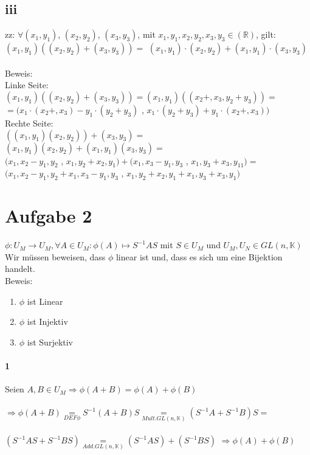 \documentclass[10pt,a4paper]{article}
\begin{document}
\subsection{iii}
zz: $\forall (x_{1},y_{1})$, $(x_{2},y_{2})$, $(x_{3},y_{3})$, mit $x_{1},y_{1},x_{2},y_{2},x_{3},y_{3} \in (\mathbb{R}) $,  gilt:\\
$(x_{1},y_{1})((x_{2},y_{2}) + (x_{3},y_{3})) = $ 
$(x_{1},y_{1}) \cdot (x_{2},y_{2}) + (x_{1},y_{1}) \cdot (x_{3},y_{3})$\\\\
Beweis:\\
Linke Seite:\\
$(x_{1},y_{1})((x_{2},y_{2}) + (x_{3},y_{3})) = (x_{1},y_{1})((x_{2}+,x_{3},y_{2}+y_{3})) =$\\
$= (x_{1}\cdot (x_{2}+,x_{3})-y_{1}\cdot (y_{2}+y_{3})$ , $x_{1}\cdot (y_{2}+y_{3})+y_{1}\cdot (x_{2}+,x_{3})) $ \\
Rechte Seite:\\
$((x_{1},y_{1})(x_{2},y_{2})) + (x_{3},y_{3}) = $ \\
$(x_{1},y_{1})(x_{2},y_{2})+(x_{1},y_{1})(x_{3},y_{3}) =$ \\
$(x_{1},x_{2}-y_{1},y_{2}$ , $x_{1},y_{2}+x_{2},y_{1})+(x_{1},x_{3}-y_{1},y_{3}$ , $x_{1},y_{3}+x_{3},y_{11}) =$\\
$ ( x_{1},x_{2}-y_{1},y_{2}+x_{1},x_{3}-y_{1},y_{3}$ , $x_{1},y_{2}+x_{2},y_{1} 
+x_{1},y_{3}+x_{3},y_{1}) $
\begin{flushright} \checkmark \end{flushright}

\newpage
\section{Aufgabe 2}
$ \phi: U_{M} \rightarrow  U_{M} , \forall A \in U_{M}: \phi(A)\mapsto S^{-1}AS$ mit $S \in U_{M}$ und $U_{M}, U_{N} \in GL(n,\mathbb{K})$ \\ 
Wir müssen beweisen, dass $\phi$ linear ist und, dass es sich um eine Bijektion handelt.\\
Beweis: \\
\begin{enumerate}
\item $\phi$ ist Linear
\item $\phi$ ist Injektiv
\item $\phi$ ist Surjektiv
\end{enumerate}
\paragraph{1}
Seien $A,B \in U_{M} \Rightarrow \phi(A+B)=\phi(A) + \phi(B) $\\\\
$ \Rightarrow \phi(A+B) \underset{DEF \phi}{=} S^{-1}(A+B)S \underset{Mult. GL(n,\mathbb{K})}{=} (S^{-1}A+S^{-1}B)S =$\\\\
$(S^{-1}AS+S^{-1}BS) \underset{Add. GL(n,\mathbb{K})}{=} (S^{-1}AS)+(S^{-1}BS) $
$ \Rightarrow \phi(A) + \phi(B)$\begin{flushright} \checkmark \end{flushright}
\end{document}
